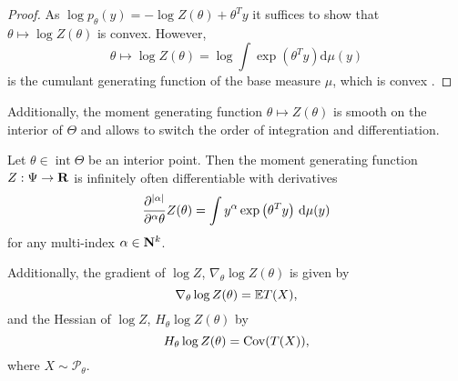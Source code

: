 \begin{proof}
    As $\log p_{\theta}(y) = - \log Z(\theta) + \theta^{T} y$ it suffices to show that $\theta \mapsto \log Z(\theta)$ is convex. However, 
    $$\theta \mapsto \log Z(\theta) = \log \int \exp \left( \theta^{T}y \right) \mathrm d \mu(y)$$ is the cumulant generating function of the base measure $\mu$, which is convex \citep[p. 144f]{Billingsley1995Probabilitya}.
\end{proof}

Additionally, the moment generating function $\theta \mapsto Z(\theta)$ is smooth on the interior of $\Theta$ and allows to switch the order of integration and differentiation.
\begin{theorem}
    \label{thm:logZsmooth}
    Let $\theta \in \operatorname{int} \Theta$ be an interior point. Then the moment generating function $Z: \Psi \to \mathbf R$ is infinitely often differentiable with derivatives 
    $$
        \frac{\partial^{\lvert \alpha \rvert}}{\partial^{\alpha}\theta} Z(\theta) = \int y^{\alpha} \exp \left( \theta^{T} y \right) \,\mathrm d \mu(y)
    $$
    for any multi-index $\alpha \in \mathbf N^{k}$.

    Additionally, the gradient of $\log Z$, $\nabla_{\theta} \log Z(\theta)$ is given by
    $$
        \nabla_{\theta} \log Z(\theta) = \mathbb E T(X),
    $$
    and the Hessian of $\log Z$, $H_{\theta} \log Z(\theta)$ by
    $$
        H_{\theta} \log Z(\theta) = \operatorname{Cov} (T(X)),
    $$
    where $X \sim \mathcal P_{\theta}$.
    
\end{theorem}

